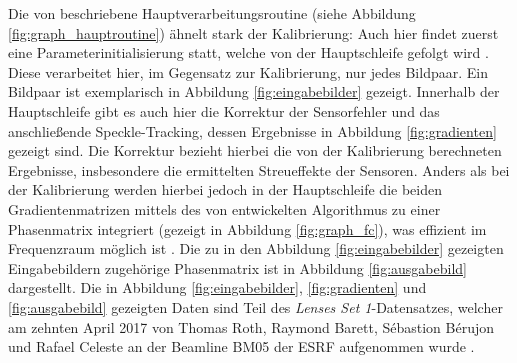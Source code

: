 Die von \citeauthor{Ber15} beschriebene Hauptverarbeitungsroutine (siehe Abbildung \ref{fig:graph_hauptroutine}) ähnelt stark der Kalibrierung: Auch hier findet zuerst eine Parameterinitialisierung statt, welche von der Hauptschleife gefolgt wird . Diese verarbeitet hier, im Gegensatz zur Kalibrierung, nur jedes Bildpaar. Ein Bildpaar ist exemplarisch in Abbildung \ref{fig:eingabebilder} gezeigt. Innerhalb der Hauptschleife gibt es auch hier die Korrektur der Sensorfehler und das anschließende Speckle-Tracking, dessen Ergebnisse in Abbildung \ref{fig:gradienten} gezeigt sind. Die Korrektur bezieht hierbei die von der Kalibrierung berechneten Ergebnisse, insbesondere die ermittelten Streueffekte der Sensoren. Anders als bei der Kalibrierung werden hierbei jedoch in der Hauptschleife die beiden Gradientenmatrizen mittels des von \citeauthor{FC88} entwickelten Algorithmus zu einer Phasenmatrix integriert (gezeigt in Abbildung \ref{fig:graph_fc}), was effizient im Frequenzraum möglich ist \cite{FC88}. Die zu in den Abbildung \ref{fig:eingabebilder} gezeigten Eingabebildern zugehörige Phasenmatrix ist in Abbildung \ref{fig:ausgabebild} dargestellt. Die in Abbildung \ref{fig:eingabebilder}, \ref{fig:gradienten} und \ref{fig:ausgabebild} gezeigten Daten sind Teil des \textit{Lenses Set 1}-Datensatzes, welcher am zehnten April 2017 von Thomas Roth, Raymond Barett, Sébastion Bérujon und Rafael Celeste an der Beamline BM05 der \gls{ESRF} aufgenommen wurde \cite{RBB+17}. 

